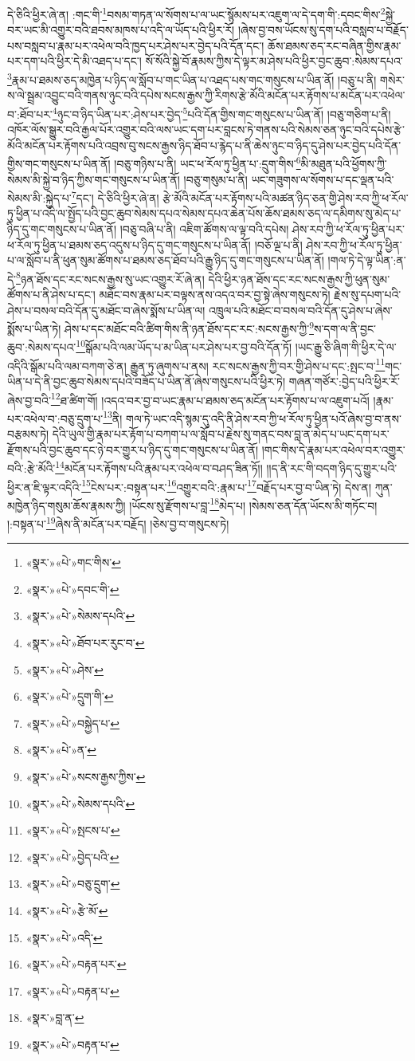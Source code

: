 དེ་ཅིའི་ཕྱིར་ཞེ་ན། :གང་གི་\footnote{«སྣར་»«པེ་»གང་གིས་}བསམ་གཏན་ལ་སོགས་པ་ལ་ཡང་སྙོམས་པར་འཇུག་ལ་དེ་དག་གི་:དབང་གིས་\footnote{«སྣར་»«པེ་»དབང་གི་}སྐྱེ་བར་ཡང་མི་འགྱུར་བའི་ཐབས་མཁས་པ་འདི་ལ་ཡོད་པའི་ཕྱིར་རོ། །ཞེས་བྱ་བས་ཡོངས་སུ་དག་པའི་བསླབ་པ་བརྗོད་པས་བསླབ་པ་རྣམ་པར་འཕེལ་བའི་ཁྱད་པར་ཤེས་པར་བྱེད་པའི་དོན་དང་། ཆོས་ཐམས་ཅད་རང་བཞིན་གྱིས་རྣམ་པར་དག་པའི་ཕྱིར་དེ་མི་འཐད་པ་དང་། སོ་སོའི་སྐྱེ་བོ་རྣམས་ཀྱིས་དེ་ལྟར་མ་ཤེས་པའི་ཕྱིར་བྱང་ཆུབ་:སེམས་དཔའ་\footnote{«སྣར་»«པེ་»སེམས་དཔའི་}རྣམ་པ་ཐམས་ཅད་མཁྱེན་པ་ཉིད་ལ་སློབ་པ་གང་ཡིན་པ་འཐད་པས་གང་གསུངས་པ་ཡིན་ནོ། །བཅུ་པ་ནི། གསེར་ས་ལེ་སྦྲམ་འབྱུང་བའི་གནས་ཉུང་བའི་དཔེས་སངས་རྒྱས་ཀྱི་རིགས་རྩེ་མོའི་མངོན་པར་རྟོགས་པ་མངོན་པར་འཕེལ་བ་:ཐོབ་པར་\footnote{«སྣར་»«པེ་»ཐོབ་པར་རུང་བ་}ཉུང་བ་ཉིད་ཡིན་པར་:ཤེས་པར་བྱེད་\footnote{«སྣར་»«པེ་»ཤེས་}པའི་དོན་གྱིས་གང་གསུངས་པ་ཡིན་ནོ། །བཅུ་གཅིག་པ་ནི། འཁོར་ལོས་སྒྱུར་བའི་རྒྱལ་པོར་འགྱུར་བའི་ལས་ཡང་དག་པར་བླངས་ཏེ་གནས་པའི་སེམས་ཅན་ཉུང་བའི་དཔེས་རྩེ་མོའི་མངོན་པར་རྟོགས་པའི་འབྲས་བུ་སངས་རྒྱས་ཉིད་ཐོབ་པ་རྙེད་པ་ནི་ཆེས་ཉུང་བ་ཉིད་དུ་ཤེས་པར་བྱེད་པའི་དོན་གྱིས་གང་གསུངས་པ་ཡིན་ནོ། །བཅུ་གཉིས་པ་ནི། ཡང་ཕ་རོལ་ཏུ་ཕྱིན་པ་:དྲུག་གིས་\footnote{«སྣར་»«པེ་»དྲུག་གི་}མི་མཐུན་པའི་ཕྱོགས་ཀྱི་སེམས་མི་སྐྱེ་བ་ཉིད་ཀྱིས་གང་གསུངས་པ་ཡིན་ནོ། །བཅུ་གསུམ་པ་ནི། ཡང་གཟུགས་ལ་སོགས་པ་དང་ལྡན་པའི་སེམས་མི་:སྐྱེད་པ་\footnote{«སྣར་»«པེ་»བསྐྱེད་པ་}དང་། དེ་ཅིའི་ཕྱིར་ཞེ་ན། རྩེ་མོའི་མངོན་པར་རྟོགས་པའི་མཚན་ཉིད་ཅན་གྱི་ཤེས་རབ་ཀྱི་ཕ་རོལ་ཏུ་ཕྱིན་པ་འདི་ལ་སྤྱོད་པའི་བྱང་ཆུབ་སེམས་དཔའ་སེམས་དཔའ་ཆེན་པོས་ཆོས་ཐམས་ཅད་ལ་དམིགས་སུ་མེད་པ་ཉིད་དུ་གང་གསུངས་པ་ཡིན་ནོ། །བཅུ་བཞི་པ་ནི། འཇིག་ཚོགས་ལ་ལྟ་བའི་དཔེས། ཤེས་རབ་ཀྱི་ཕ་རོལ་ཏུ་ཕྱིན་པར་ཕ་རོལ་ཏུ་ཕྱིན་པ་ཐམས་ཅད་འདུས་པ་ཉིད་དུ་གང་གསུངས་པ་ཡིན་ནོ། །བཅོ་ལྔ་པ་ནི། ཤེས་རབ་ཀྱི་ཕ་རོལ་ཏུ་ཕྱིན་པ་ལ་སློབ་པ་ནི་ཕུན་སུམ་ཚོགས་པ་ཐམས་ཅད་ཐོབ་པའི་རྒྱུ་ཉིད་དུ་གང་གསུངས་པ་ཡིན་ནོ། །གལ་ཏེ་དེ་ལྟ་ཡིན་:ན་དེ་\footnote{«སྣར་»«པེ་»ན་}ཉན་ཐོས་དང་རང་སངས་རྒྱས་སུ་ཡང་འགྱུར་རོ་ཞེ་ན། དེའི་ཕྱིར་ཉན་ཐོས་དང་རང་སངས་རྒྱས་ཀྱི་ཕུན་སུམ་ཚོགས་པ་ནི་ཤེས་པ་དང་། མཐོང་བས་རྣམ་པར་བལྟས་ནས་འདའ་བར་བྱ་སྟེ་ཞེས་གསུངས་ཏེ། རྗེས་སུ་དཔག་པའི་ཤེས་པ་བསལ་བའི་དོན་དུ་མཐོང་བ་ཞེས་སྨོས་པ་ཡིན་ལ། འཁྲུལ་པའི་མཐོང་བ་བསལ་བའི་དོན་དུ་ཤེས་པ་ཞེས་སྨོས་པ་ཡིན་ཏེ། ཤེས་པ་དང་མཐོང་བའི་ཚིག་གིས་ནི་ཉན་ཐོས་དང་རང་:སངས་རྒྱས་ཀྱི་\footnote{«སྣར་»«པེ་»སངས་རྒྱས་ཀྱིས་}ས་དག་ལ་ནི་བྱང་ཆུབ་:སེམས་དཔའ་\footnote{«སྣར་»«པེ་»སེམས་དཔའི་}སྒོམ་པའི་ལམ་ཡོད་པ་མ་ཡིན་པར་ཤེས་པར་བྱ་བའི་དོན་ཏོ། །ཡང་རྒྱུ་ཅི་ཞིག་གི་ཕྱིར་དེ་ལ་འདིའི་སྒོམ་པའི་ལམ་བཀག་ཅེ་ན། རྒྱུན་ཏུ་ཞུགས་པ་ནས། རང་སངས་རྒྱས་ཀྱི་བར་གྱི་ཤེས་པ་དང་:སྤང་བ་\footnote{«སྣར་»«པེ་»སྤངས་པ་}གང་ཡིན་པ་དེ་ནི་བྱང་ཆུབ་སེམས་དཔའི་བཟོད་པ་ཡིན་ནོ་ཞེས་གསུངས་པའི་ཕྱིར་ཏེ། གཞན་གཙོར་:བྱེད་པའི་ཕྱིར་རོ་ཞེས་བྱ་བའི་\footnote{«སྣར་»«པེ་»བྱེད་པའི་}ཐ་ཚིག་གོ། །འདའ་བར་བྱ་བ་ཡང་རྣམ་པ་ཐམས་ཅད་མངོན་པར་རྟོགས་པ་ལ་འཇུག་པའོ། །རྣམ་པར་འཕེལ་བ་:བཅུ་དྲུག་པ་\footnote{«སྣར་»«པེ་»བཅུ་དྲུག་}ནི། གལ་ཏེ་ཡང་འདི་སྙམ་དུ་འདི་ནི་ཤེས་རབ་ཀྱི་ཕ་རོལ་ཏུ་ཕྱིན་པའོ་ཞེས་བྱ་བ་ནས་བརྩམས་ཏེ། དེའི་ཡུལ་གྱི་རྣམ་པར་རྟོག་པ་བཀག་པ་ལ་སློབ་པ་རྗེས་སུ་གནང་བས་བླ་ན་མེད་པ་ཡང་དག་པར་རྫོགས་པའི་བྱང་ཆུབ་དང་ཉེ་བར་གྱུར་པ་ཉིད་དུ་གང་གསུངས་པ་ཡིན་ནོ། །གང་གིས་དེ་རྣམ་པར་འཕེལ་བར་འགྱུར་བའི་:རྩེ་མོའི་\footnote{«སྣར་»«པེ་»རྩེ་མོ་}མངོན་པར་རྟོགས་པའི་རྣམ་པར་འཕེལ་བ་བཤད་ཟིན་ཏོ།། །།ད་ནི་རང་གི་བདག་ཉིད་དུ་གྱུར་པའི་ཕྱིར་ན་ཇི་ལྟར་འདིའི་\footnote{«སྣར་»«པེ་»འདི་}ངེས་པར་:བསྟན་པར་\footnote{«སྣར་»«པེ་»བརྟན་པར་}འགྱུར་བའི་:རྣམ་པ་\footnote{«སྣར་»«པེ་»བརྟན་པ་}བརྗོད་པར་བྱ་བ་ཡིན་ཏེ། དེས་ན། ཀུན་མཁྱེན་ཉིད་གསུམ་ཆོས་རྣམས་ཀྱི། །ཡོངས་སུ་རྫོགས་པ་བླ་\footnote{«སྣར་»བླ་ན་}མེད་པ། །སེམས་ཅན་དོན་ཡོངས་མི་གཏོང་བ། །:བསྟན་པ་\footnote{«སྣར་»«པེ་»བརྟན་པ་}ཞེས་ནི་མངོན་པར་བརྗོད། །ཅེས་བྱ་བ་གསུངས་ཏེ། 